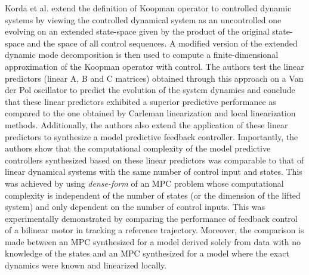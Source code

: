 Korda et al. \cite{MPC_Korda} extend the definition of Koopman operator to controlled dynamic systems by viewing the controlled dynamical system as an uncontrolled one evolving on an extended state-space given by the product of the original state-space and the space of all control sequences. A modified version of the extended dynamic mode decomposition is then used to compute a finite-dimensional approximation of the Koopman operator with control. The authors test the linear predictors (linear A, B and C matrices) obtained through this approach on a Van der Pol oscillator to predict the evolution of the system dynamics and conclude that these linear predictors exhibited a superior predictive performance as compared to the one obtained by Carleman linearization and local linearization methods. Additionally, the authors also extend the application of these linear predictors to synthesize a model predictive feedback controller. Importantly, the authors show that the computational complexity of the model predictive controllers synthesized based on these linear predictors was comparable to that of linear dynamical systems with the same number of control input and states. This was achieved by using \textit{dense-form} of an MPC problem whose computational complexity is independent of the number of states (or the dimension of the lifted system) and only dependent on the number of control inputs. This was experimentally demonstrated by comparing the performance of feedback control of a bilinear motor in tracking a reference trajectory. Moreover, the comparison is made between an MPC synthesized for a model derived solely from data with no knowledge of the states and an MPC synthesized for a model where the exact dynamics were known and linearized locally.